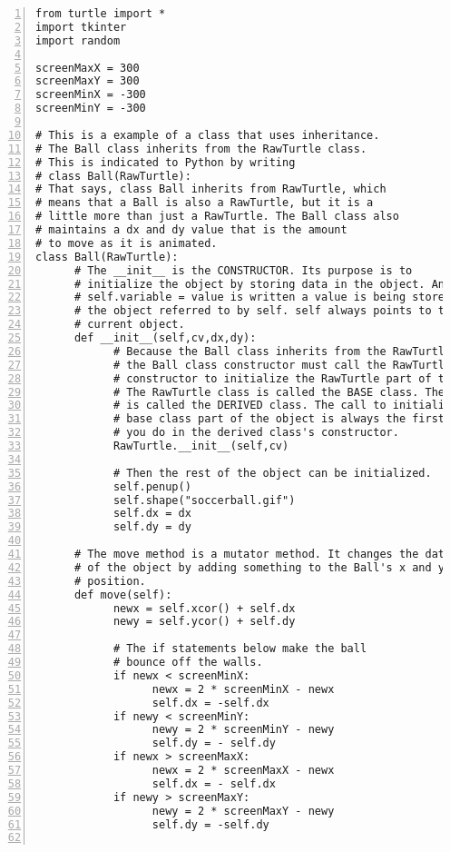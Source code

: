 \begin{lstlisting}[basicstyle=\ttfamily\scriptsize,numbers=left]
from turtle import *
import tkinter
import random

screenMaxX = 300
screenMaxY = 300
screenMinX = -300
screenMinY = -300
    
# This is a example of a class that uses inheritance. 
# The Ball class inherits from the RawTurtle class. 
# This is indicated to Python by writing
# class Ball(RawTurtle):
# That says, class Ball inherits from RawTurtle, which 
# means that a Ball is also a RawTurtle, but it is a 
# little more than just a RawTurtle. The Ball class also 
# maintains a dx and dy value that is the amount
# to move as it is animated.         
class Ball(RawTurtle):
      # The __init__ is the CONSTRUCTOR. Its purpose is to 
      # initialize the object by storing data in the object. Anytime
      # self.variable = value is written a value is being stored in 
      # the object referred to by self. self always points to the 
      # current object.
      def __init__(self,cv,dx,dy):
            # Because the Ball class inherits from the RawTurtle class
            # the Ball class constructor must call the RawTurtle class
            # constructor to initialize the RawTurtle part of the object.
            # The RawTurtle class is called the BASE class. The Ball class 
            # is called the DERIVED class. The call to initialize the 
            # base class part of the object is always the first thing
            # you do in the derived class's constructor.
            RawTurtle.__init__(self,cv)

            # Then the rest of the object can be initialized.
            self.penup()
            self.shape("soccerball.gif")
            self.dx = dx
            self.dy = dy

      # The move method is a mutator method. It changes the data
      # of the object by adding something to the Ball's x and y 
      # position. 
      def move(self):
            newx = self.xcor() + self.dx
            newy = self.ycor() + self.dy

            # The if statements below make the ball
            # bounce off the walls.
            if newx < screenMinX:
                  newx = 2 * screenMinX - newx
                  self.dx = -self.dx
            if newy < screenMinY:
                  newy = 2 * screenMinY - newy
                  self.dy = - self.dy
            if newx > screenMaxX:
                  newx = 2 * screenMaxX - newx
                  self.dx = - self.dx
            if newy > screenMaxY:
                  newy = 2 * screenMaxY - newy
                  self.dy = -self.dy
            

\end{lstlisting}
